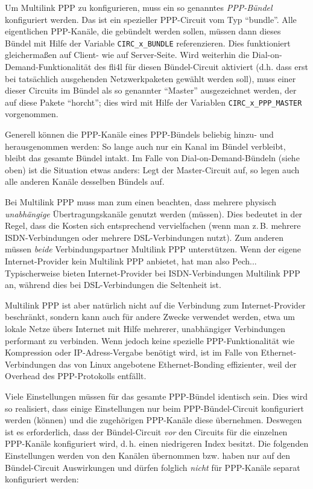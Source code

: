 Um Multilink PPP zu konfigurieren, muss ein so genanntes \emph{PPP-Bündel}
konfiguriert werden. Das ist ein spezieller PPP-Circuit vom Typ ``bundle''.
Alle eigentlichen PPP-Kanäle, die gebündelt werden sollen, müssen dann dieses
Bündel mit Hilfe der Variable \verb+CIRC_x_BUNDLE+ referenzieren. Dies
funktioniert gleichermaßen auf Client- wie auf Server-Seite. Wird weiterhin die
Dial-on-Demand-Funktionalität des fli4l für diesen Bündel-Circuit aktiviert
(d.h. dass erst bei tatsächlich ausgehenden Netzwerkpaketen gewählt werden
soll), muss einer dieser Circuits im Bündel als so genannter ``Master''
ausgezeichnet werden, der auf diese Pakete ``horcht''; dies wird mit Hilfe der
Variablen \verb+CIRC_x_PPP_MASTER+ vorgenommen.

Generell können die PPP-Kanäle eines PPP-Bündels beliebig hinzu- und
herausgenommen werden: So lange auch nur ein Kanal im Bündel verbleibt, bleibt
das gesamte Bündel intakt. Im Falle von Dial-on-Demand-Bündeln (siehe oben) ist
die Situation etwas anders: Legt der Master-Circuit auf, so legen auch alle
anderen Kanäle desselben Bündels auf.

Bei Multilink PPP muss man zum einen beachten, dass mehrere physisch
\emph{unabhängige} Übertragungskanäle genutzt werden (müssen). Dies bedeutet
in der Regel, dass die Kosten sich entsprechend vervielfachen (wenn man z.\,B.
mehrere ISDN-Verbindungen oder mehrere DSL-Verbindungen nutzt). Zum anderen
müssen \emph{beide} Verbindungspartner Multilink PPP unterstützen. Wenn der
eigene Internet-Provider kein Multilink PPP anbietet, hat man also Pech...
Typischerweise bieten Internet-Provider bei ISDN-Verbindungen Multilink PPP an,
während dies bei DSL-Verbindungen die Seltenheit ist.

Multilink PPP ist aber natürlich nicht auf die Verbindung zum Internet-Provider
beschränkt, sondern kann auch für andere Zwecke verwendet werden, etwa um
lokale Netze übers Internet mit Hilfe mehrerer, unabhängiger Verbindungen
performant zu verbinden. Wenn jedoch keine spezielle PPP-Funktionalität wie
Kompression oder IP-Adress-Vergabe benötigt wird, ist im Falle von
Ethernet-Verbindungen das von Linux angebotene Ethernet-Bonding effizienter,
weil der Overhead des PPP-Protokolls entfällt.

Viele Einstellungen müssen für das gesamte PPP-Bündel identisch sein. Dies wird
so realisiert, dass einige Einstellungen nur beim PPP-Bündel-Circuit
konfiguriert werden (können) und die zugehörigen PPP-Kanäle diese übernehmen.
Deswegen ist es erforderlich, dass der Bündel-Circuit \emph{vor} den Circuits
für die einzelnen PPP-Kanäle konfiguriert wird, d.\,h. einen niedrigeren Index
besitzt. Die folgenden Einstellungen werden von den Kanälen übernommen bzw.
haben nur auf den Bündel-Circuit Auswirkungen und dürfen folglich \emph{nicht}
für PPP-Kanäle separat konfiguriert werden:


